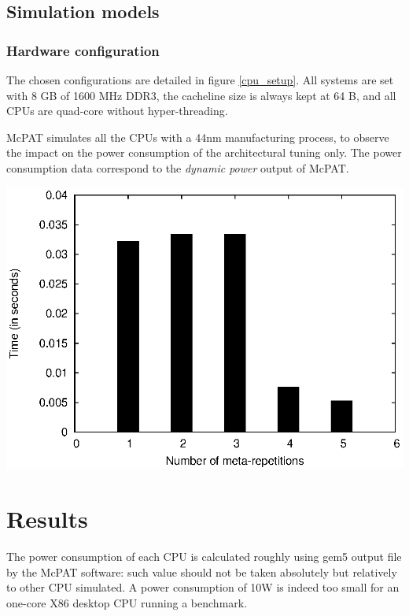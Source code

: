 \documentclass{article}
\newenvironment{Figure}
  {\par\medskip\noindent\center\minipage{0.9\linewidth}}
  {\endminipage\par\bigskip\medskip}
\begin{document}
\begin{multicols}{2}
\subsection{Simulation models}
\subsubsection{Hardware configuration}
The chosen configurations are detailed in figure \ref{cpu_setup}. All systems are set with 8 GB of 1600 MHz DDR3, the cacheline size is always kept at 64 B, and all CPUs are quad-core without hyper-threading.


McPAT simulates all the CPUs with a 44nm manufacturing process, to observe the impact on the power consumption of the architectural tuning only. The power consumption data correspond to the \textit{dynamic power} output of McPAT.

\begin{Figure}
\centering
\bigskip
\includegraphics[width=\linewidth]{nogood.eps}
\end{Figure}

\section{Results}
\label{results}
The power consumption of each CPU is calculated roughly using gem5 output file by the McPAT software: such value should not be taken absolutely but relatively to other CPU simulated. A power consumption of 10W is indeed too small for an one-core X86 desktop CPU running a benchmark. 


\end{multicols}
\end{document}
